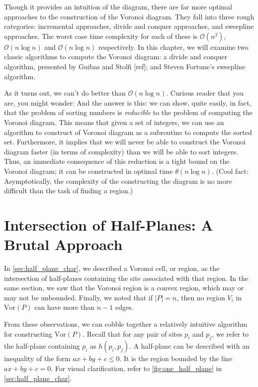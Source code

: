 \documentclass[12pt,twoside]{reedthesis}
\begin{document}
    Though it provides an intuition of the diagram, there are far more optimal approaches to the construction of the Voronoi diagram. They fall into three rough categories: incremental approaches, divide and conquer approaches, and sweepline approaches. The worst case time complexity for each of these is $\mathcal{O}(n^{2})$, $\mathcal{O}(n\log n)$ and $\mathcal{O}(n\log n)$ respectively. In this chapter, we will examine two classic algorithms to compute the Voronoi diagram: a divide and conquer algorithm, presented by Guibas and Stolfi [ref]; and Steven Fortune's sweepline algorithm. \par
    
    As it turns out, we can't do better than $\mathcal{O}(n\log n)$. Curious reader that you are, you might wonder:  And the answer is this: we can show, quite easily, in fact, that the problem of sorting numbers is \emph{reducible} to the problem of computing the Voronoi diagram. This means that given a set of integers, we can use an algorithm to construct of Voronoi diagram as a subroutine to compute the sorted set. Furthermore, it implies that we will never be able to construct the Voronoi diagram faster (in terms of complexity) than we will be able to sort integers. Thus, an immediate consequence of this reduction is a tight bound on the Voronoi diagram; it can be constructed in optimal time $\theta(n\log n)$. (Cool fact: Asymptotically, the complexity of the constructing the diagram is no more difficult than the task of finding a region.)\par

  \section{Intersection of Half-Planes: A Brutal Approach} %
  \label{sec:a_naive_approach}
     In \cref{sec:half_plane_char}, we described a Voronoi cell, or region, as the intersection of half-planes containing the site associated with that region. In the same section, we saw that the Voronoi region is a convex region, which may or may not be unbounded. Finally, we noted that if $|P| = n$, then no region $V_{i}$ in $\mbox{Vor}(P)$ can have more than $n-1$ edges. \par

     From these observations, we can cobble together a relatively intuitive algorithm for constructing $\mbox{Vor}(P)$. Recall that for any pair of sites $p_{i}$ and $p_{j}$, we refer to the half-plane containing $p_{i}$ as $h(p_{i}, p_{j})$. A half-plane can be described with an inequality of the form $ax + by + c \leq 0$. It is the region bounded by the line $ax + by + c = 0$. For visual clarification, refer to \cref{fig:one_half_plane} in \cref{sec:half_plane_char}.  
\end{document}
